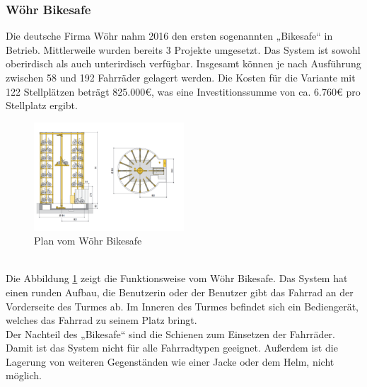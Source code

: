 \subsubsection{Wöhr Bikesafe}
Die deutsche Firma Wöhr nahm 2016 den ersten sogenannten „Bikesafe“ in Betrieb.\cite{woehrfirma} Mittlerweile wurden bereits 3 Projekte umgesetzt.\cite{woehrbikesafe} Das System ist sowohl oberirdisch als auch unterirdisch verfügbar. Insgesamt können je nach Ausführung zwischen 58 und 192 Fahrräder gelagert werden. Die Kosten für die Variante mit 122 Stellplätzen beträgt 825.000€, was eine Investitionssumme von ca. 6.760€ pro Stellplatz ergibt.\cite*{richtpreisangebot} \\
\begin{figure}[h]
    \centering
    \includegraphics[width=0.5\textwidth]{images/bikesafe.png}
    \caption{Plan vom Wöhr Bikesafe \cite{woehrbikesafebroschuere}}
    \label{fig:bikesafe}
\end{figure}\\

Die Abbildung \ref{fig:bikesafe} zeigt die Funktionsweise vom Wöhr Bikesafe. Das System hat einen runden Aufbau, die Benutzerin oder der Benutzer gibt das Fahrrad an der Vorderseite des Turmes ab. Im Inneren des Turmes befindet sich ein Bediengerät, welches das Fahrrad zu seinem Platz bringt.\\
Der Nachteil des „Bikesafe“ sind die Schienen zum Einsetzen der Fahrräder. Damit ist das System nicht für alle Fahrradtypen geeignet. Außerdem ist die Lagerung von weiteren Gegenständen wie einer Jacke oder dem Helm, nicht möglich.\\
